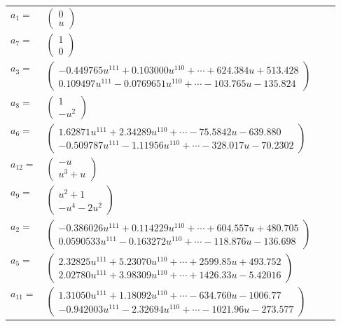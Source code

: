 \documentclass[1p]{elsarticle_modified}
\theoremstyle{definition}
\begin{document}
\begin{tabular}{m{7pt} m{180pt} m{7pt} m{180pt} }
\flushright $a_{1}=$&$\begin{pmatrix}0\\u\end{pmatrix}$ \\
\flushright $a_{7}=$&$\begin{pmatrix}1\\0\end{pmatrix}$ \\
\flushright $a_{3}=$&$\begin{pmatrix}-0.449765 u^{111}+0.103000 u^{110}+\cdots+624.384 u+513.428\\0.109497 u^{111}-0.0769651 u^{110}+\cdots-103.765 u-135.824\end{pmatrix}$ \\
\flushright $a_{8}=$&$\begin{pmatrix}1\\- u^2\end{pmatrix}$ \\
\flushright $a_{6}=$&$\begin{pmatrix}1.62871 u^{111}+2.34289 u^{110}+\cdots-75.5842 u-639.880\\-0.509787 u^{111}-1.11956 u^{110}+\cdots-328.017 u-70.2302\end{pmatrix}$ \\
\flushright $a_{12}=$&$\begin{pmatrix}- u\\u^3+u\end{pmatrix}$ \\
\flushright $a_{9}=$&$\begin{pmatrix}u^2+1\\- u^4-2 u^2\end{pmatrix}$ \\
\flushright $a_{2}=$&$\begin{pmatrix}-0.386026 u^{111}+0.114229 u^{110}+\cdots+604.557 u+480.705\\0.0590533 u^{111}-0.163272 u^{110}+\cdots-118.876 u-136.698\end{pmatrix}$ \\
\flushright $a_{5}=$&$\begin{pmatrix}2.32825 u^{111}+5.23070 u^{110}+\cdots+2599.85 u+493.752\\2.02780 u^{111}+3.98309 u^{110}+\cdots+1426.33 u-5.42016\end{pmatrix}$ \\
\flushright $a_{11}=$&$\begin{pmatrix}1.31050 u^{111}+1.18092 u^{110}+\cdots-634.760 u-1006.77\\-0.942003 u^{111}-2.32694 u^{110}+\cdots-1021.96 u-273.577\end{pmatrix}$ \\

\end{tabular}
\end{document}
